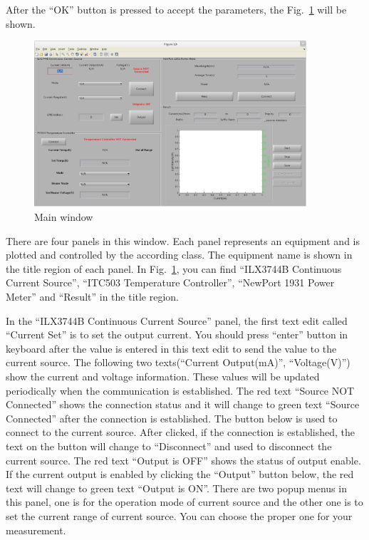 \documentclass[a4paper,12pt]{article}
\begin{document}
After the ``OK'' button is pressed to accept the parameters, the
Fig.~\ref{fig:main_window} will be shown.
\begin{figure}[htbp]
	\centering
	\includegraphics[width=0.9\textwidth]{./figs/main_window.eps}
	\caption{Main window}
	\label{fig:main_window}
\end{figure}

There are four panels in this window. Each panel represents an equipment and is
plotted and controlled by the according class. The equipment name is shown in
the title region of each panel. In Fig.~\ref{fig:main_window}, you can find
``ILX3744B Continuous Current Source'', ``ITC503 Temperature Controller'', ``NewPort
1931 Power Meter'' and ``Result'' in the title region. 

In the ``ILX3744B Continuous Current Source'' panel, the first text edit called
``Current Set'' is to set the output current. You should press ``enter'' button in
keyboard after the value is entered in this text edit to send the value to the
current source. The following two texts(``Current Output(mA)'', ``Voltage(V)'') show
the current and voltage information. These values will be updated periodically
when the communication is established. The red text ``Source NOT Connected'' shows
the connection status and it will change to green text ``Source Connected'' after
the connection is established. The button below is used to connect to the
current source. After clicked, if the connection is established, the text on the
button will change to ``Disconnect'' and used to disconnect the current source.
The red text ``Output is OFF'' shows the status of output enable. If the current
output is enabled by clicking the ``Output'' button below, the red text will
change to green text ``Output is ON''. There are two popup menus in this panel,
one is for the operation mode of current source and the other one is to set the
current range of current source. You can choose the proper one for your
measurement.
\end{document}

